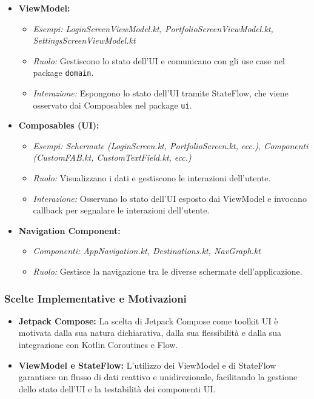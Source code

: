 \begin{itemize}
    \item \textbf{ViewModel:}
    \begin{itemize}
        \item \textit{Esempi: LoginScreenViewModel.kt,
        PortfolioScreenViewModel.kt, SettingsScreenViewModel.kt}
        \item \textit{Ruolo:} Gestiscono lo stato dell'UI e comunicano con gli
        use case nel package \texttt{domain}.
        \item \textit{Interazione:} Espongono lo stato dell'UI tramite
        StateFlow, che viene osservato dai Composables nel package \texttt{ui}.
    \end{itemize}
    \item \textbf{Composables (UI):}
    \begin{itemize}
        \item \textit{Esempi: Schermate (LoginScreen.kt, PortfolioScreen.kt,
        ecc.), Componenti (CustomFAB.kt, CustomTextField.kt, ecc.)}
        \item \textit{Ruolo:} Visualizzano i dati e gestiscono le interazioni
        dell'utente.
        \item \textit{Interazione:} Osservano lo stato dell'UI esposto dai
        ViewModel e invocano callback per segnalare le interazioni dell'utente.
    \end{itemize}
    \item \textbf{Navigation Component:}
    \begin{itemize}
        \item \textit{Componenti: AppNavigation.kt, Destinations.kt,
        NavGraph.kt}
        \item \textit{Ruolo:} Gestisce la navigazione tra le diverse schermate
        dell'applicazione.
    \end{itemize}
\end{itemize}

\subsubsection{Scelte Implementative e Motivazioni}

\begin{itemize}
    \item \textbf{Jetpack Compose:} La scelta di Jetpack Compose come toolkit UI
    è motivata dalla sua natura dichiarativa, dalla sua flessibilità e dalla sua
    integrazione con Kotlin Coroutines e Flow.
    \item \textbf{ViewModel e StateFlow:} L'utilizzo dei ViewModel e di
    StateFlow garantisce un flusso di dati reattivo e unidirezionale,
    facilitando la gestione dello stato dell'UI e la testabilità dei componenti
    UI\@.
\end{itemize}

